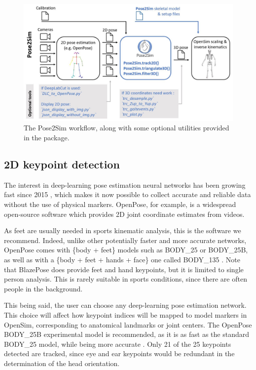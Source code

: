 \begin{figure}[hbtp]
	\centering
	\def\svgwidth{1\columnwidth}
	\fontsize{10pt}{10pt}\selectfont
	\includegraphics[width=\linewidth]{"../Chap3/Figures/Pose2Sim_utilities.jpg"}
	\caption{The Pose2Sim workflow, along with some optional utilities provided in the package.}
	\label{fig_opensimutilities}
\end{figure}


\subsection{2D keypoint detection}

The interest in deep-learning pose estimation neural networks has been growing fast since 2015 \cite{Zheng2022}, which makes it now possible to collect accurate and reliable data without the use of physical markers. OpenPose, for example, is a widespread open-source software which provides 2D joint coordinate estimates from videos. 

As feet are usually needed in sports kinematic analysis, this is the software we recommend. Indeed, unlike other potentially faster and more accurate networks, OpenPose comes with \{body + feet\} models such as BODY\_25 or BODY\_25B, as well as with a \{body + feet + hands + face\} one called BODY\_135 \cite{Hidalgo2019}. Note that BlazePose does provide feet and hand keypoints, but it is limited to single person analysis. This is rarely suitable in sports conditions, since there are often people in the background.

This being said, the user can choose any deep-learning pose estimation network. This choice will affect how keypoint indices will be mapped to model markers in OpenSim, corresponding to anatomical landmarks or joint centers. The OpenPose BODY\_25B experimental model is recommended, as it is as fast as the standard BODY\_25 model, while being more accurate \cite{Hidalgo2019}. Only 21 of the 25 keypoints detected are tracked, since eye and ear keypoints would be redundant in the determination of the head orientation. 

